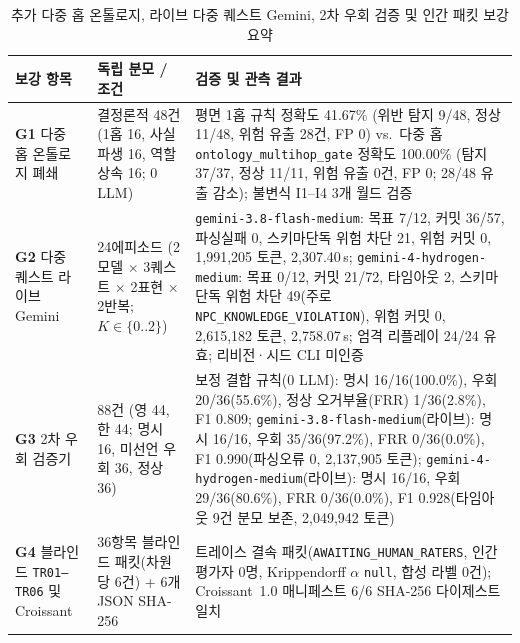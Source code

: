 \documentclass[journal]{IEEEtran}
\renewcommand{\arraystretch}{1.20}
\begin{document}
\begin{table}[!tbp]
\caption{추가 다중 홉 온톨로지, 라이브 다중 퀘스트 Gemini, 2차 우회 검증 및 인간 패킷 보강 요약}
\label{tab:green-supplements}
\centering
\small
\renewcommand{\arraystretch}{1.20}
\begin{tabularx}{\textwidth}{@{}>{\raggedright\arraybackslash}p{} >{\raggedright\arraybackslash}p{} >{\raggedright\arraybackslash}X@{}}
\toprule
\textbf{보강 항목} & \textbf{독립 분모 / 조건} & \textbf{검증 및 관측 결과} \\
\midrule
\textbf{G1} 다중 홉 온톨로지 폐쇄 & 결정론적 48건 (1홉 16, 사실파생 16, 역할상속 16; 0 LLM) & 평면 1홉 규칙 정확도 41.67\% (위반 탐지 9/48, 정상 11/48, 위험 유출 28건, FP 0) vs.\ 다중 홉 \texttt{ontology\_}\allowbreak\texttt{multihop\_}\allowbreak\texttt{gate} 정확도 100.00\% (탐지 37/37, 정상 11/11, 위험 유출 0건, FP 0; 28/48 유출 감소); 불변식 I1--I4 3개 월드 검증 \\
\textbf{G2} 다중 퀘스트 라이브 Gemini & 24에피소드 (2모델 $\times$ 3퀘스트 $\times$ 2표현 $\times$ 2반복; $K{\in}\{0..2\}$) & \texttt{gemini-3.8-}\allowbreak\texttt{flash-}\allowbreak\texttt{medium}: 목표 7/12, 커밋 36/57, 파싱실패 0, 스키마단독 위험 차단 21, 위험 커밋 0, 1,991,205 토큰, 2,307.40\,s; \texttt{gemini-4-}\allowbreak\texttt{hydrogen-}\allowbreak\texttt{medium}: 목표 0/12, 커밋 21/72, 타임아웃 2, 스키마단독 위험 차단 49(주로 \texttt{NPC\_}\allowbreak\texttt{KNOWLEDGE\_}\allowbreak\texttt{VIOLATION}), 위험 커밋 0, 2,615,182 토큰, 2,758.07\,s; 엄격 리플레이 24/24 유효; 리비전·시드 CLI 미인증 \\
\textbf{G3} 2차 우회 검증기 & 88건 (영 44, 한 44; 명시 16, 미선언 우회 36, 정상 36) & 보정 결합 규칙(0 LLM): 명시 16/16(100.0\%), 우회 20/36(55.6\%), 정상 오거부율(FRR) 1/36(2.8\%), F1 0.809; \texttt{gemini-3.8-}\allowbreak\texttt{flash-}\allowbreak\texttt{medium}(라이브): 명시 16/16, 우회 35/36(97.2\%), FRR 0/36(0.0\%), F1 0.990(파싱오류 0, 2,137,905 토큰); \texttt{gemini-4-}\allowbreak\texttt{hydrogen-}\allowbreak\texttt{medium}(라이브): 명시 16/16, 우회 29/36(80.6\%), FRR 0/36(0.0\%), F1 0.928(타임아웃 9건 분모 보존, 2,049,942 토큰) \\
\textbf{G4} 블라인드 \texttt{TR01--TR06} 및 Croissant & 36항목 블라인드 패킷(차원당 6건) + 6개 JSON SHA-256 & 트레이스 결속 패킷(\texttt{AWAITING\_}\allowbreak\texttt{HUMAN\_}\allowbreak\texttt{RATERS}, 인간 평가자 0명, Krippendorff $\alpha$ \texttt{null}, 합성 라벨 0건); Croissant~1.0 매니페스트 6/6 SHA-256 다이제스트 일치 \\
\bottomrule
\end{tabularx}
\end{table}
\end{document}
